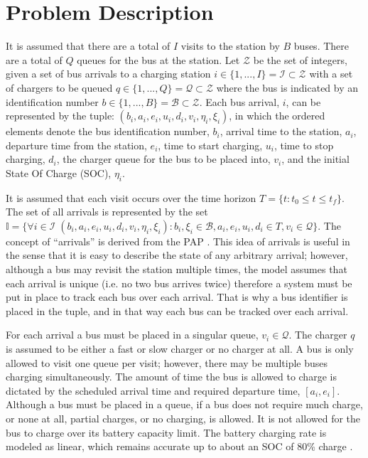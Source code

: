 \documentclass[11pt,a4paper,final]{article}
\newcommand{\visit}{(b_i, a_i, e_i, u_i, d_i, v_i, \eta_i, \xi_i)}
\newcommand{\I}{\mathbb{I}}                 %
\newcommand{\Iset}{\mathcal{I}}             %
\newcommand{\Bset}{\mathcal{B}}             %
\newcommand{\Qset}{\mathcal{Q}}             %
\begin{document}
\section{Problem Description}
\label{sec:problem-description}
It is assumed that there are a total of \(I\) visits to the station by \(B\) buses. There are a total of \(Q\) queues for the
bus at the station. Let \(\mathcal{Z}\) be the set of integers, given a set of bus arrivals to a charging station \(i \in \{1,..., I\}
= \Iset \subset \mathcal{Z}\) with a set of chargers to be queued \(q \in \{1,..., Q\} = \Qset \subset \mathcal{Z}\) where the bus is indicated by an
identification number \(b \in \{1,..., B\} = \Bset \subset \mathcal{Z}\). Each bus arrival, \(i\), can be represented by the tuple: \(\visit\),
in which the ordered elements denote the bus identification number, \(b_i\), arrival time to the station, \(a_i\), departure
time from the station, \(e_i\), time to start charging, \(u_i\), time to stop charging, \(d_i\), the charger queue for the bus
to be placed into, \(v_i\), and the initial State Of Charge (SOC), \(\eta_i\).

It is assumed that each visit occurs over the time horizon \(T = \{t : t_0 \le t \le t_f \}\). The set of all arrivals is
represented by the set \(\I = \{\forall i \in \Iset \; \visit: b_i, \xi_i \in \Bset, a_i, e_i, u_i, d_i \in T, v_i \in \Qset \}\). The
concept of ``arrivals'' is derived from the PAP \cite{qarebagh-2019-optim-sched}. This idea of arrivals is useful in the
sense that it is easy to describe the state of any arbitrary arrival; however, although a bus may revisit the station
multiple times, the model assumes that each arrival is unique (i.e. no two bus arrives twice) therefore a system must be
put in place to track each bus over each arrival. That is why a bus identifier is placed in the tuple, and in that way
each bus can be tracked over each arrival.

For each arrival a bus must be placed in a singular queue, \(v_i \in \Qset\). The charger \(q\) is assumed to be either a fast
or slow charger or no charger at all. A bus is only allowed to visit one queue per visit; however, there may be multiple
buses charging simultaneously. The amount of time the bus is allowed to charge is dictated by the scheduled arrival time
and required departure time, \([a_i, e_i]\). Although a bus must be placed in a queue, if a bus does not require much
charge, or none at all, partial charges, or no charging, is allowed. It is not allowed for the bus to charge over its
battery capacity limit. The battery charging rate is modeled as linear, which remains accurate up to about an SOC of 80\%
charge \cite{li-2016-batter-elect}.
\end{document}

